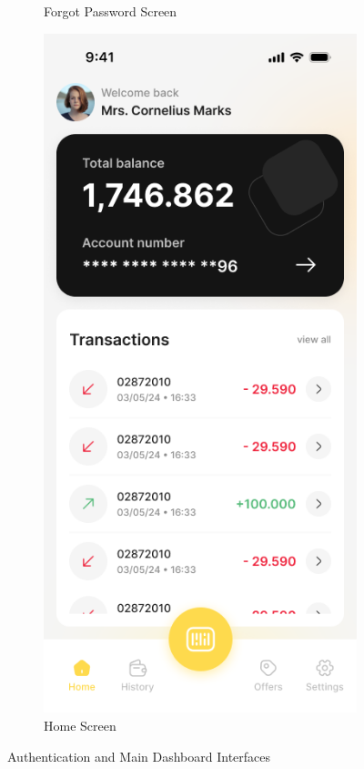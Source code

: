 \begin{figure}[H]
\begin{subfigure}[b]{0.32\textwidth}
        \caption{Forgot Password Screen}
        \label{fig:forgot_password_screen}
    \end{subfigure}
    \hfill
    \begin{subfigure}[b]{0.32\textwidth}
        \centering
        \includegraphics[width=\textwidth]{images/home_screen.png}
        \caption{Home Screen}
        \label{fig:home_screen}
    \end{subfigure}
    \caption{Authentication and Main Dashboard Interfaces}
    \label{fig:auth_dashboard}
\end{figure}

